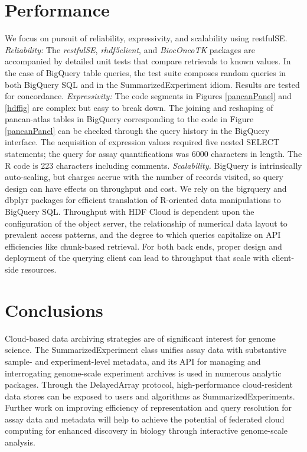 \documentclass[applications]{gen-bioinformatics}
\newcommand{\Rpackage}[1]{{\textit{#1}}}
\begin{document}
\section*{Performance}

We focus on pursuit of reliability,
expressivity, and scalability using restfulSE.  
\textit{Reliability:} 
The \Rpackage{restfulSE}, \Rpackage{rhdf5client},
and \Rpackage{BiocOncoTK} packages are accompanied by detailed unit
tests that compare retrievals to known values.  In the
case of BigQuery table queries, the test
suite composes random queries 
in both BigQuery SQL and in the SummarizedExperiment idiom.  Results
are tested for concordance.  \textit{Expressivity:} The code
segments in Figures \ref{pancanPanel} and \ref{hdffig} are
complex but easy to break down.  The joining and
reshaping of pancan-atlas tables in BigQuery corresponding
to the code in Figure \ref{pancanPanel}
can be checked through the query history in the BigQuery
interface.  The acquisition of expression values required
five nested SELECT statements; the query for assay quantifications
was 6000 characters in length.
The R code is 223 characters including comments.
\textit{Scalability.}  BigQuery is intrinsically auto-scaling,
but charges accrue with the number of records visited, 
so query design can have effects on throughput
and cost.  We rely on the bigrquery and dbplyr packages for
efficient translation of R-oriented data manipulations to 
BigQuery SQL.  Throughput with HDF Cloud 
is dependent upon the configuration of the object server,
the relationship of numerical data layout to prevalent access
patterns, and the degree to which queries capitalize on
API efficiencies like chunk-based retrieval.  For both
back ends, proper design and deployment of the querying client can
lead to throughput that scale with client-side resources.

\section*{Conclusions}

Cloud-based data archiving strategies are of significant
interest for genome science.  The SummarizedExperiment class
unifies assay data with substantive sample- and experiment-level
metadata, and its API for managing and interrogating
genome-scale experiment archives is used in numerous
analytic packages.  Through the DelayedArray protocol, high-performance
cloud-resident data stores can be exposed to users and
algorithms as SummarizedExperiments.  Further work on improving
efficiency of
representation and query resolution for assay data and metadata
will help to achieve the potential of federated cloud computing for
enhanced discovery in biology through interactive genome-scale analysis.
\end{document}
